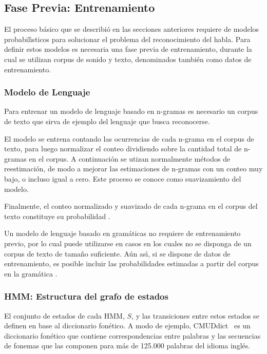 \subsection{Fase Previa: Entrenamiento}
\label{sec:training}

El proceso b\'asico que se describi\'o en las secciones anteriores requiere de modelos probabil{\'\i}sticos para
solucionar el problema del reconocimiento del habla. Para definir estos modelos es necesaria una
fase previa de entrenamiento, durante la cual se utilizan corpus de sonido y texto, denominados tambi\'en
como datos de entrenamiento.

\subsubsection{Modelo de Lenguaje}

Para entrenar un modelo de lenguaje basado en n-gramas es necesario un corpus de texto que 
sirva de ejemplo del lenguaje que busca reconocerse.

El modelo se entrena contando las ocurrencias de cada n-grama en el corpus de texto, para luego
normalizar el conteo dividiendo sobre la cantidad total de n-gramas en el corpus.
A continuaci\'on se utizan normalmente m\'etodos de reestimaci\'on, de modo a mejorar las estimaciones 
de n-gramas con un conteo muy bajo, o incluso igual a cero. Este proceso se conoce como suavizamiento
del modelo.

Finalmente, el conteo normalizado y suavizado de cada n-grama en el corpus del texto constituye su
probabilidad \cite{CollinsLanguage}.

Un modelo de lenguaje basado en gram\'aticas no requiere de entrenamiento previo, por lo cual puede
utilizarse en casos en los cuales no se disponga de un corpus de texto de tama\~no suficiente.
A\'un as{\'\i}, si se dispone de datos de entrenamiento, es posible incluir las probabilidades estimadas
a partir del corpus en la gram\'atica \cite{huang-handbook10}.

\subsubsection{HMM: Estructura del grafo de estados}
El conjunto de estados de cada HMM, $S$, y las transiciones entre estos estados se definen en base
al diccionario fon\'etico. A modo de ejemplo, \mbox{CMUDdict \cite{CMUdict}} es un diccionario fon\'etico
que contiene correspondencias entre palabras y las secuencias de fonemas que las componen para m\'as de
125.000 palabras del idioma ingl\'es.

